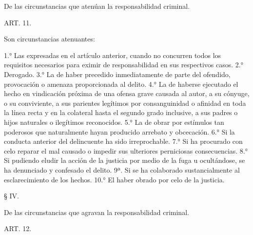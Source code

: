     De las circunstancias que atenúan la responsabilidad criminal.


    ART. 11.

    Son circunstancias atenuantes:

    1.° Las expresadas en el artículo anterior, cuando no concurren todos los requisitos necesarios para eximir de responsabilidad en sus respectivos casos.
    2.° Derogado.
    3.° La de haber precedido inmediatamente de parte del ofendido, provocación o amenaza proporcionada al delito.
    4.° La de haberse ejecutado el hecho en vindicación próxima de una ofensa grave causada al autor, a su cónyuge, o su conviviente, a sus parientes legítimos por consanguinidad o afinidad en toda la línea recta y en la colateral hasta el segundo grado inclusive, a sus padres o hijos naturales o ilegítimos reconocidos.
    5.°  La de obrar por estímulos tan poderosos que naturalmente hayan producido arrebato y obcecación.
    6.°  Si la conducta anterior del delincuente ha sido irreprochable.
    7.°  Si ha procurado con celo reparar el mal causado o impedir sus ulteriores perniciosas consecuencias.
    8.°  Si pudiendo eludir la acción de la justicia por medio de la fuga u ocultándose, se ha denunciado y confesado el delito.
    9ª. Si se ha colaborado sustancialmente al esclarecimiento de los hechos.
    10.° El haber obrado por celo de la justicia.




    § IV.

    De las circunstancias que agravan la responsabilidad criminal.


    ART. 12.

